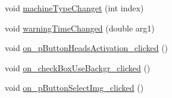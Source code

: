 \begin{DoxyCompactItemize}
\item 
void \mbox{\hyperlink{classGeneralSettingDialog_a30243bd5ab4a0e2016b8a481504ccb62}{machine\+Type\+Changet}} (int index)
\item 
void \mbox{\hyperlink{classGeneralSettingDialog_a9b1d7ada4c3dccc4c3a516b69dd714b9}{warning\+Time\+Changed}} (double arg1)
\item 
void \mbox{\hyperlink{classGeneralSettingDialog_a8b72a332c8c98096b1f15cf1fd6b01be}{on\+\_\+p\+Button\+Heads\+Activation\+\_\+clicked}} ()
\item 
void \mbox{\hyperlink{classGeneralSettingDialog_a2fbe72c63737ff21b4780013a0cbe35a}{on\+\_\+check\+Box\+Use\+Backgr\+\_\+clicked}} ()
\item 
void \mbox{\hyperlink{classGeneralSettingDialog_a28115db3d9b5197703e789ac6cac8c9a}{on\+\_\+p\+Button\+Select\+Img\+\_\+clicked}} ()
\end{DoxyCompactItemize}
